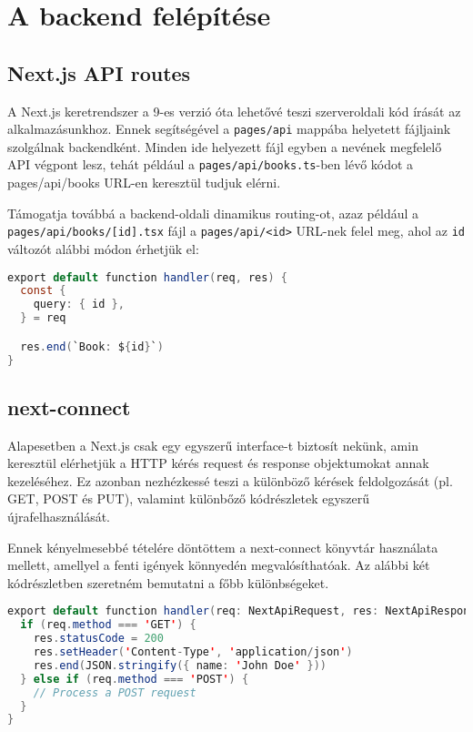 \section{A backend felépítése}

\subsection{Next.js API routes}

A Next.js keretrendszer a 9-es verzió óta lehetővé teszi szerveroldali kód írását az alkalmazásunkhoz.
Ennek segítségével a \lstinline|pages/api| mappába helyetett fájljaink szolgálnak backendként. Minden ide helyezett fájl
egyben a nevének megfelelő API végpont lesz, tehát például a \lstinline|pages/api/books.ts|-ben lévő kódot a pages/api/books URL-en keresztül tudjuk elérni.

Támogatja továbbá a backend-oldali dinamikus routing-ot, azaz például a \lstinline|pages/api/books/[id].tsx| fájl a \lstinline|pages/api/<id>| URL-nek felel meg, ahol
az \lstinline|id| változót alábbi módon érhetjük el:

\begin{lstlisting}[language=Java, caption=Next.js dinamikus routing]
export default function handler(req, res) {
  const {
    query: { id },
  } = req

  res.end(`Book: ${id}`)
}
\end{lstlisting}

\subsection{next-connect}
Alapesetben a Next.js csak egy egyszerű interface-t biztosít nekünk, amin keresztül elérhetjük a HTTP kérés request és response objektumokat annak kezeléséhez.
Ez azonban nezhézkessé teszi a különböző kérések feldolgozását (pl. GET, POST és PUT), valamint különbőző kódrészletek egyszerű újrafelhasználását.

Ennek kényelmesebbé tételére döntöttem a next-connect könyvtár használata mellett, amellyel a fenti igények könnyedén megvalósíthatóak.
Az alábbi két kódrészletben szeretném bemutatni a főbb különbségeket.

\begin{lstlisting}[language=Java, caption=Default Next.js API routes]
export default function handler(req: NextApiRequest, res: NextApiResponse) {
  if (req.method === 'GET') {
    res.statusCode = 200
    res.setHeader('Content-Type', 'application/json')
    res.end(JSON.stringify({ name: 'John Doe' }))
  } else if (req.method === 'POST') {
    // Process a POST request
  }
}
\end{lstlisting}

